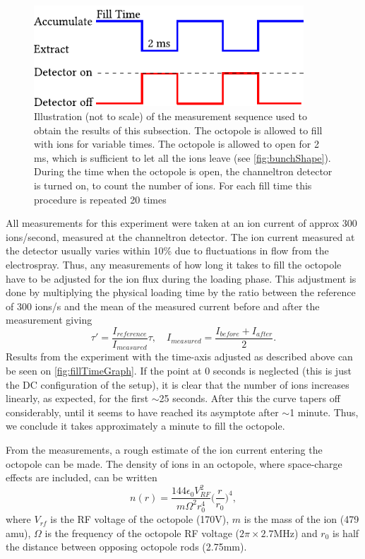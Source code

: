 \begin{figure}
    \centering
    \includegraphics[width = 0.9\textwidth]{main/StoragePulse.pdf}
    \caption{Illustration (not to scale) of the measurement sequence used to obtain the results of this subsection. The octopole is allowed to fill with ions for variable times. The octopole is allowed to open for 2 ms, which is sufficient to let all the ions leave (see \cref{fig:bunchShape}). During the time when the octopole is open,
    the channeltron detector is turned on, to count the number of ions. For each fill time this procedure is repeated 20 times}
    \label{fig:storageSequence}
\end{figure}
All measurements for this experiment were taken at an ion current of approx 300 ions/second, measured at the channeltron detector.
The ion current measured at the detector usually varies within 10\% due to fluctuations in flow from the electrospray. Thus, any measurements of how long it takes to fill the octopole have to be adjusted for the ion flux during the loading phase.  This adjustment is done by multiplying the physical loading time by the ratio between the reference of 300 ions/s and the mean of the measured current before and after the measurement giving
\begin{equation}
    \tau'= \frac{I_{reference}}{I_{measured}}\tau,\quad I_{measured} = \frac{I_{before}+I_{after}}{2}.
\end{equation}
Results from the experiment with the time-axis adjusted as described above can be seen on \cref{fig:fillTimeGraph}. If the point at 0 seconds is neglected (this is just the DC configuration of the setup), it is clear that the number of ions increases linearly, as expected, for the first $\sim$25 seconds.
After this the curve tapers off considerably, until it seems to have reached its asymptote after $\sim$1 minute. Thus, we conclude it takes approximately a minute to fill the octopole.

From the measurements, a rough estimate of the ion current entering the octopole can be made.
The density of ions in an octopole, where space-charge effects are included, can be written \cite{MajimaDensity}
\begin{equation}
    n(r) = \frac{144\epsilon_0 V_{RF}^2}{m\Omega^2r_0^4}\bigg(\frac{r}{r_0}\bigg)^4,
\end{equation}
where $V_{rf}$ is the RF voltage of the octopole (170V), $m$ is the mass of the ion (479 amu), $\Omega$ is the frequency of the octopole RF voltage ($2\pi\times2.7$MHz) and $r_0$ is half the distance between opposing octopole rods (2.75mm).


